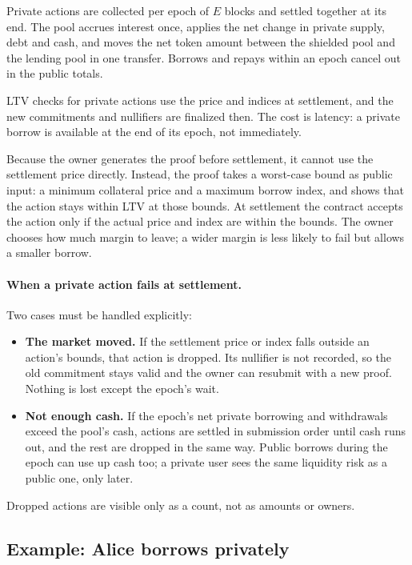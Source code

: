 \documentclass[11pt,a4paper]{article}
\begin{document}
Private actions are collected per epoch of $E$ blocks and settled together at its end. The pool accrues interest
once, applies the net change in private supply, debt and cash, and moves the net token amount between the
shielded pool and the lending pool in one transfer. Borrows and repays within an epoch cancel out in the public
totals.

LTV checks for private actions use the price and indices at settlement, and the new commitments and nullifiers
are finalized then. The cost is latency: a private borrow is available at the end of its epoch, not immediately.

Because the owner generates the proof before settlement, it cannot use the settlement price directly. Instead,
the proof takes a worst-case bound as public input: a minimum collateral price and a maximum borrow index, and
shows that the action stays within LTV at those bounds. At settlement the contract accepts the action only if
the actual price and index are within the bounds. The owner chooses how much margin to leave; a wider margin is
less likely to fail but allows a smaller borrow.

\paragraph{When a private action fails at settlement.} Two cases must be handled explicitly:
\begin{itemize}
  \item \textbf{The market moved.} If the settlement price or index falls outside an action's bounds, that
        action is dropped. Its nullifier is not recorded, so the old commitment stays valid and the owner can
        resubmit with a new proof. Nothing is lost except the epoch's wait.
  \item \textbf{Not enough cash.} If the epoch's net private borrowing and withdrawals exceed the pool's cash,
        actions are settled in submission order until cash runs out, and the rest are dropped in the same way.
        Public borrows during the epoch can use up cash too; a private user sees the same liquidity risk as a
        public one, only later.
\end{itemize}
Dropped actions are visible only as a count, not as amounts or owners.

\subsection{Example: Alice borrows privately}
\end{document}

